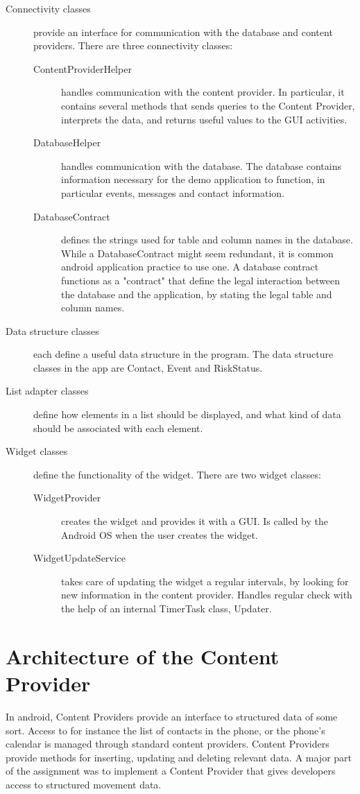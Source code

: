 \begin{description}
\item[Connectivity classes]
provide an interface for communication with the database and content providers. There are three connectivity classes:
\begin{description}
\item[ContentProviderHelper] handles communication with the content provider. In particular, it contains several methods that sends queries to the Content Provider, interprets the data, and returns useful values to the GUI activities.
\item[DatabaseHelper] handles communication with the database. The database contains information necessary for the demo application to function, in particular events, messages and contact information.
\item[DatabaseContract] defines the strings used for table and column names in the database. While a DatabaseContract might seem redundant, it is common android application practice to use one. A database contract functions as a "contract" that define the legal interaction between the database and the application, by stating the legal table and column names.
\end{description}

\item[Data structure classes]
each define a useful data structure in the program. The data structure classes in the app are Contact, Event and RiskStatus.

\item[List adapter classes]
define how elements in a list should be displayed, and what kind of data should be associated with each element.
\item[Widget classes]
define the functionality of the widget. There are two widget classes:
\begin{description}
\item[WidgetProvider] creates the widget and provides it with a GUI. Is called by the Android OS when the user creates the widget.
\item[WidgetUpdateService] takes care of updating the widget a regular intervals, by looking for new information in the content provider. Handles regular check with the help of an internal TimerTask class, Updater.
\end{description}
\end{description}
\section{Architecture of the Content Provider}
In android, Content Providers provide an interface to structured data of some sort. Access to for instance the list of contacts in the phone, or the phone's calendar is managed through standard content providers. Content Providers provide methods for inserting, updating and deleting relevant data. A major part of the assignment was to implement a Content Provider that gives developers access to structured movement data.

